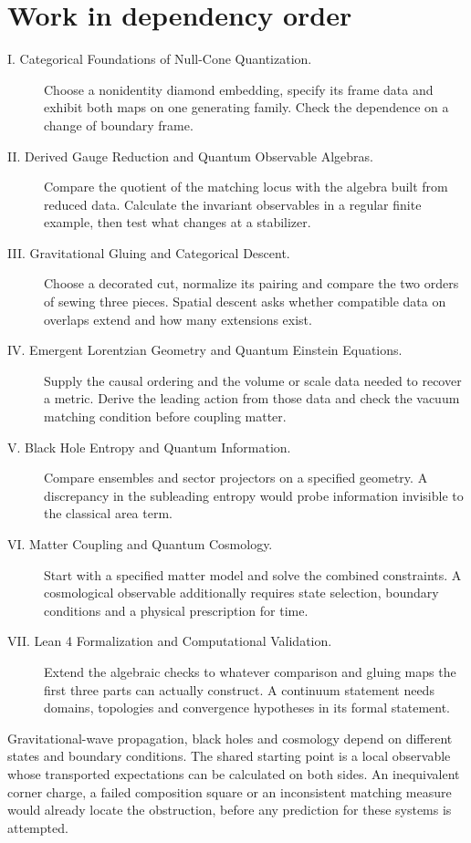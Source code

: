 \documentclass[11pt,letterpaper]{article}
\begin{document}
\section{Work in dependency order}
\begin{description}
\item[I. Categorical Foundations of Null-Cone Quantization.] Choose a nonidentity diamond embedding, specify its frame data and exhibit both maps on one generating family. Check the dependence on a change of boundary frame.
\item[II. Derived Gauge Reduction and Quantum Observable Algebras.] Compare the quotient of the matching locus with the algebra built from reduced data. Calculate the invariant observables in a regular finite example, then test what changes at a stabilizer.
\item[III. Gravitational Gluing and Categorical Descent.] Choose a decorated cut, normalize its pairing and compare the two orders of sewing three pieces. Spatial descent asks whether compatible data on overlaps extend and how many extensions exist.
\item[IV. Emergent Lorentzian Geometry and Quantum Einstein Equations.]\hfill\break Supply the causal ordering and the volume or scale data needed to recover a metric. Derive the leading action from those data and check the vacuum matching condition before coupling matter.
\item[V. Black Hole Entropy and Quantum Information.] Compare ensembles and sector projectors on a specified geometry. A discrepancy in the subleading entropy would probe information invisible to the classical area term.
\item[VI. Matter Coupling and Quantum Cosmology.] Start with a specified matter model and solve the combined constraints. A cosmological observable additionally requires state selection, boundary conditions and a physical prescription for time.
\item[VII. Lean 4 Formalization and Computational Validation.] Extend the algebraic checks to whatever comparison and gluing maps the first three parts can actually construct. A continuum statement needs domains, topologies and convergence hypotheses in its formal statement.
\end{description}
Gravitational-wave propagation, black holes and cosmology depend on different states and boundary conditions. The shared starting point is a local observable whose transported expectations can be calculated on both sides. An inequivalent corner charge, a failed composition square or an inconsistent matching measure would already locate the obstruction, before any prediction for these systems is attempted.
\end{document}
